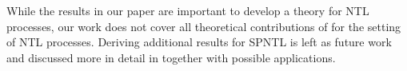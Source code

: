 While the results in our paper are important to develop a theory for NTL processes, our work does not cover all theoretical contributions of \cite{james2006poisson} for the setting of NTL processes. Deriving additional results for SPNTL is left as future work and discussed more in detail in  together with possible applications. 